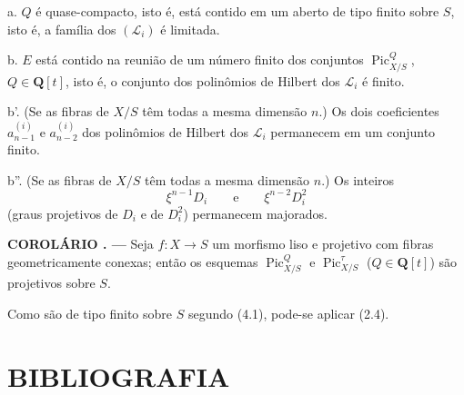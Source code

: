 \documentclass[11pt,twoside,openany]{book}
\numberwithin{equation}{section}
\newcommand{\src}[1]{%
  \phantomsection\hypertarget{src:#1}{}%
  \marginpar{\raggedleft\footnotesize\sffamily #1}%
}
\theoremstyle{plain}
\theoremstyle{definition}
\theoremstyle{remark}
\newcommand{\result}[2]{%
  \par\medskip\noindent\textbf{#1%
  \if\relax\detokenize{#2}\relax\else\space#2\fi. ---}\enspace
}
\newcommand{\FgaUnitKey}{frontmatter}
\renewcommand{\src}[1]{%
  \phantomsection\hypertarget{src:\FgaUnitKey:#1}{}%
  \marginpar{\raggedleft\footnotesize\sffamily #1}%
}
\begin{document}
\noindent a. $Q$ é quase-compacto,
isto é, está contido em um aberto de tipo finito sobre $S$, isto é, a família
dos $(\mathcal L_i)$ é limitada.

\noindent b. $E$ está contido na reunião de um número finito dos conjuntos
$\operatorname{Pic}_{X/S}^Q$, $Q\in\mathbf Q[t]$, isto é, o conjunto dos
polinômios de Hilbert dos $\mathcal L_i$ é finito.

\noindent b'. (Se as fibras de $X/S$ têm todas a mesma dimensão $n$.) Os dois
coeficientes $a_{n-1}^{(i)}$ e $a_{n-2}^{(i)}$ dos polinômios de Hilbert dos
$\mathcal L_i$ permanecem em um conjunto finito.
\src{243}
\noindent b''. (Se as fibras de $X/S$ têm todas a mesma dimensão $n$.) Os
inteiros
\[
\xi^{n-1}D_i\qquad\text{e}\qquad\xi^{n-2}D_i^2
\]
(graus projetivos de $D_i$ e de $D_i^2$) permanecem majorados.

\result{COROLÁRIO}{4.2} Seja $f:X\longrightarrow S$ um morfismo liso e
projetivo com fibras geometricamente conexas; então os esquemas
$\operatorname{Pic}_{X/S}^Q$ e $\operatorname{Pic}_{X/S}^\tau$
($Q\in\mathbf Q[t]$) são projetivos sobre $S$.

Como são de tipo finito sobre $S$ segundo (4.1), pode-se aplicar (2.4).

\section*{BIBLIOGRAFIA}
\end{document}
